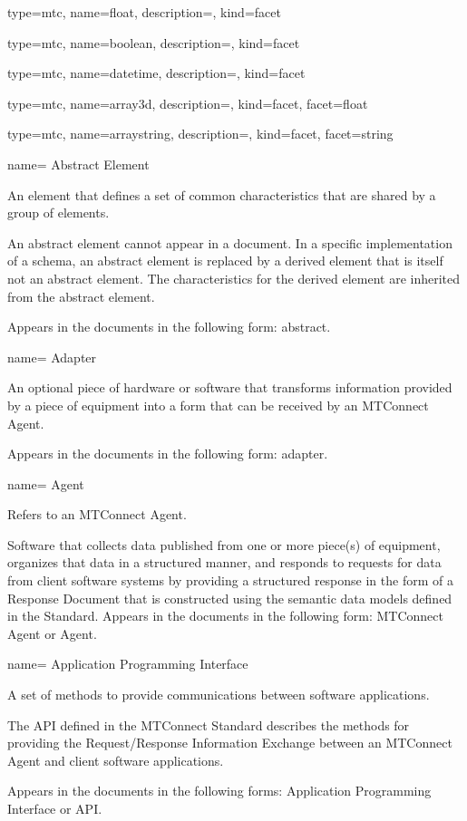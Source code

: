 {
  type=mtc,
  name={float},
  description={},
  kind={facet}
}


{
  type=mtc,
  name={boolean},
  description={},
  kind={facet}
}


{
  type=mtc,
  name={datetime},
  description={},
  kind={facet}
}


{
  type=mtc,
  name={array3d},
  description={},
  kind={facet},
  facet={\gls{float}}
}

{
  type=mtc,
  name={arraystring},
  description={},
  kind={facet},
  facet={\gls{string}}
}

{
  name= {Abstract Element}
}
{
  An element that defines a set of common characteristics that are shared by a group of elements.
  
  An abstract element cannot appear in a document. In a specific implementation of a schema, an abstract element is replaced by a derived element that is itself not an abstract element. The characteristics for the derived element are inherited from the abstract element. 
  
  Appears in the documents in the following form: abstract.
}


{
  name= {Adapter}
}
{
  An optional piece of hardware or software that transforms information provided by a piece of equipment into a form that can be received by an MTConnect Agent.

  Appears in the documents in the following form: adapter.
}


{
  name= {Agent}
}
{
  Refers to an MTConnect Agent. 
  
  Software that collects data published from one or more piece(s) of equipment, organizes that data in a structured manner, and responds to requests for data from client software systems by providing a structured response in the form of a Response Document that is constructed using the semantic data models defined in the Standard. 
  Appears in the documents in the following form: MTConnect Agent or Agent.
}


{
  name= {Application Programming Interface}
}
{
  A set of methods to provide communications between software applications.

  The API defined in the MTConnect Standard describes the methods for providing the Request/Response Information Exchange between an MTConnect Agent and client software applications.
  
  Appears in the documents in the following forms: Application Programming Interface or API.
}


